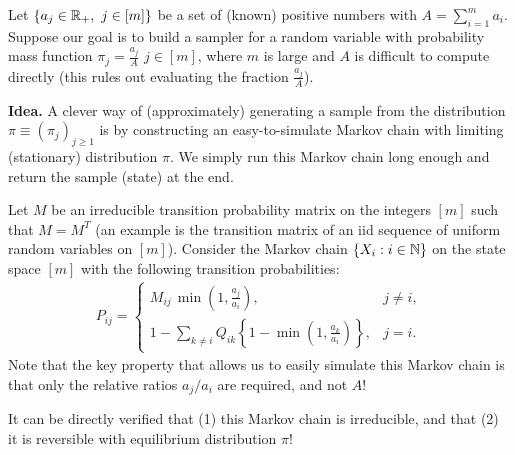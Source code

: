 \documentclass[a4paper,10pt,english]{article}
\begin{document}
\begin{shaded*}
\begin{exmp} Let $\{a_j \in \mathbb{R}_+,~ j \in [m]\}$ be a set of (known) positive numbers with $A=\sum_{i=1}^{m}a_i$. 
Suppose our goal is to build a sampler for a random variable with probability mass function $\pi_j = \frac{a_j}{A}$ $j \in [m]$, where  $m$ is large and $A$ is difficult to compute directly (this rules out evaluating the fraction $\frac{a_j}{A}$). 

{\bf Idea.} A clever way of (approximately) generating a sample from the distribution $\pi \equiv (\pi_j)_{j \geq 1}$ is by constructing an easy-to-simulate Markov chain with limiting (stationary) distribution $\pi$. We simply run this Markov chain long enough and return the sample (state) at the end.  

Let $M$ be an irreducible transition probability matrix on the integers $[m]$ such that $M = M^T$ (an example is the transition matrix of an iid sequence of uniform random variables on $[m]$). 
Consider the Markov chain $\{X_i: i \in \mathbb{N}\}$ on the state space $[m]$ with the following transition probabilities:
\begin{align*}
P_{ij} = \begin{cases}
       M_{ij} \, \min\left(1,\frac{a_j}{a_i}\right), & j \neq i,\\
       1 - \sum_{k \neq i}Q_{ik}\left\{1-\min\left(1,\frac{a_k}{a_i}\right)\right\}, & j = i.
     \end{cases}
\end{align*} 
Note that the key property that allows us to easily simulate this Markov chain is that only the relative ratios $a_j/a_i$ are required, and not $A$!

It can be directly verified that (1) this Markov chain is irreducible, and that (2) it is reversible with equilibrium distribution $\pi$!
\end{exmp}
\end{shaded*}
\end{document}
